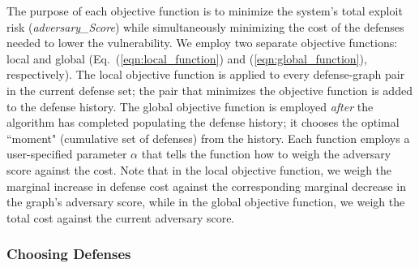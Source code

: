 \documentclass[10pt,journal,compsoc]{IEEEtran}
\begin{document}
The purpose of each objective function is to minimize the system's total exploit risk (\emph{adversary\_Score}) while simultaneously minimizing the cost of the defenses needed to lower the vulnerability. 
We employ two separate objective functions: local and global (Eq.~(\ref{eqn:local_function}) and (\ref{eqn:global_function}), respectively). The local objective function is applied to every defense-graph pair in 
the current defense set; the pair that minimizes the objective function is added to the defense 
history. The global objective function is employed \emph{after} the algorithm has completed populating 
the defense history; it chooses the optimal ``moment" (cumulative set of defenses) from the history. 
Each function employs a user-specified parameter $\alpha$ that tells the function how to weigh the 
adversary score against the cost. Note that in the local objective function, we weigh the marginal increase in defense cost against the corresponding marginal decrease in the graph's adversary score, while in the global objective function, we weigh the total cost against the current adversary score.

\subsubsection{Choosing Defenses}
\label{subsubsection:choosing_defenses}
\end{document}
